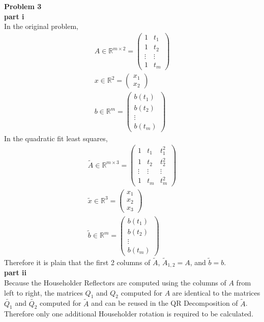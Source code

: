 \documentclass{article} %
\begin{document}
\textbf{Problem 3} \\
\textbf{part i} \\
In the original problem, 
\begin{align*}
A \in \mathbb{R}^{m \times 2} = \begin{pmatrix} 1 & t_1 \\ 1 & t_2 \\ \vdots & \vdots \\ 1 & t_m \end{pmatrix} \\
x \in \mathbb{R}^2 = \begin{pmatrix} x_1 \\ x_2 \end{pmatrix} \\
b \in \mathbb{R}^m = \begin{pmatrix} b(t_1) \\ b(t_2) \\ \vdots \\ b(t_m) \end{pmatrix}
\end{align*}
In the quadratic fit least squares,
\begin{align*}
\tilde{A} \in \mathbb{R}^{m \times 3} = \begin{pmatrix} 1 & t_1 & t_1^2 \\ 1 & t_2 & t_2^2 \\ \vdots & \vdots & \vdots \\ 1 & t_m & t_m^2 \end{pmatrix} \\
\tilde{x} \in \mathbb{R}^3 = \begin{pmatrix} x_1 \\ x_2 \\ x_3 \end{pmatrix} \\
\tilde{b} \in \mathbb{R}^m = \begin{pmatrix} b(t_1) \\ b(t_2) \\ \vdots \\ b(t_m) \end{pmatrix}
\end{align*}
Therefore it is plain that the first 2 columns of $\tilde{A}$, $\tilde{A}_{1,2} = A$, and $\tilde{b} = b$.
\\

\textbf{part ii} \\
Because the Householder Reflectors are computed using the columns of $A$ from left to right, the matrices $Q_1$ and $Q_2$ computed for $A$ are identical to the matrices $\tilde{Q_1}$ and $\tilde{Q_2}$ computed for $\tilde{A}$ and can be reused in the QR Decomposition of $\tilde{A}$.  Therefore only one additional Householder rotation is required to be calculated. \\
\end{document}
